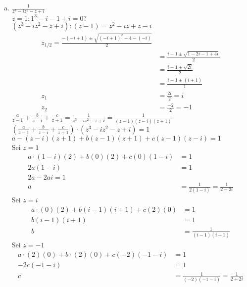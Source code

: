 \documentclass[11pt,a4paper]{article}
\begin{document}
    \begin{enumerate}[a)]
      \item $\frac{1}{z^3-iz^2-z+i}$\\
      $z=1:1^3-i-1+i=0?$\\
      $\left(z^3-iz^2-z+i\right):\left(z-1\right)=z^2-iz+z-i$
      \begin{align*}
        z_{1/2}=\frac{-\left(-i+1\right)\pm\sqrt{\left(-i+1\right)^2-4-\left(-i\right)}}{2}\\
        &=\frac{i-1\pm\sqrt{1-2i-1+4i}}{2}\\
        &=\frac{i-1\pm\sqrt{2i}}{2}\\
        &=\frac{i-1\pm\left(i+1\right)}{1}\\
        z_1&=\frac{2i}{2}=i\\
        z_2&=\frac{-2}{2}=-1
      \end{align*}
      $\frac{a}{z-1}+\frac{b}{z-i}+\frac{c}{z+1}=\frac{1}{z^3-iz^2-z+i}=\frac{1}{\left(z-1\right)\left(z-i\right)\left(z+1\right)}$\\
      $\left(\frac{a}{z-1}+\frac{b}{z-i}+\frac{c}{z+1}\right)\cdot\left(z^3-iz^2-z+i\right)=1$\\
      $a-\left(z-i\right)\left(z+1\right)+b\left(z-1\right)\left(z+1\right)+c\left(z-1\right)\left(z-i\right)=1$\\
      Sei $z=1$
      \begin{align*}
        a\cdot\left(1-i\right)\left(2\right)+b\left(0\right)\left(2\right)+c\left(0\right)\left(1-i\right)&=1\\
        2a\left(1-i\right)&=1\\
        2a-2ai=1\\
        a&=\frac{1}{2\left(1-i\right)}=\frac{1}{2-2i}
      \end{align*}
      Sei $z=i$
      \begin{align*}
        a\cdot\left(0\right)\left(2\right)+b\left(i-1\right)\left(i+1\right)+c\left(2\right)\left(0\right)&=1\\
        b\left(i-1\right)\left(i+1\right)&=1\\
        b&=\frac{1}{\left(i-1\right)\left(i+1\right)}
      \end{align*}
      Sei $z=-1$
      \begin{align*}
        a\cdot\left(2\right)\left(0\right)+b\cdot\left(2\right)\left(0\right)+c\left(-2\right)\left(-1-i\right)&=1\\
        -2c\left(-1-i\right)&=1\\
        c&=\frac{1}{\left(-2\right)\left(-1-i\right)}=\frac{1}{2+2i}\\

\end{align*}
\end{enumerate}
\end{document}
